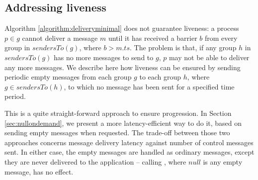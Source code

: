 \documentclass[times, 10pt]{article}
\begin{document}
%   
%   
% 
% 





\subsection{Addressing liveness}
\label{sec:liveness}

Algorithm \ref{algorithm:deliveryminimal} does not guarantee liveness: a process $p \in g$ cannot deliver a message $m$ until it has received a barrier $b$ from every group in $sendersTo(g)$, where $b > m.ts$. The problem is that, if any group $h$ in $sendersTo(g)$ has no more messages to send to $g$, $p$ may not be able to deliver any more messages. We describe here how liveness can be ensured by sending periodic empty messages from each group $g$ to each group $h$, where $g \in sendersTo(h)$, to which no message has been sent for a specified time period.

This is a quite straight-forward approach to ensure progression. In Section \ref{sec:nullondemand}, we present a more latency-efficient way to do it, based on sending empty messages when requested. The trade-off between those two approaches concerns message delivery latency against number of control messages sent. In either case, the empty messages are handled as ordinary messages, except they are never delivered to the application -- calling , where $null$ is any empty message, has no effect.
\end{document}
